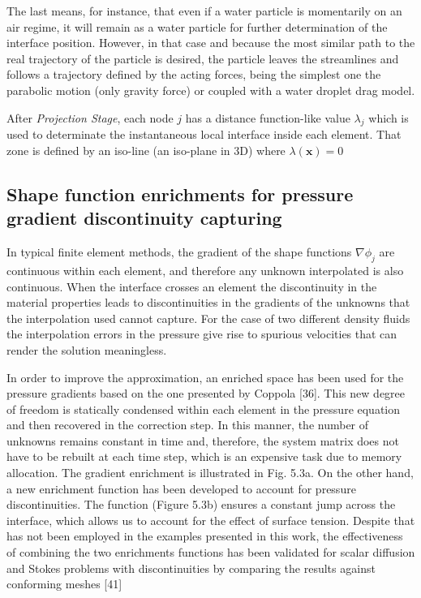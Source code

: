 \documentclass[a4paper,conference]{IEEEtran}
\newcommand{\xx}{\mathbf{x}}
\begin{document}
The last means, for instance, that even if a water particle is momentarily on an air regime, it will remain as a water particle for further determination of the interface position. However, in that case and because the most similar path to the real trajectory of the particle is desired, the particle leaves the streamlines and follows a trajectory defined by the acting forces, being the simplest one the parabolic motion (only gravity force) or coupled with a water droplet drag model.
 
After \textit{Projection Stage}, each node $j$ has a distance function-like value $\lambda_j$ which is used to determinate the instantaneous local interface inside each element. That zone is defined by an iso-line (an iso-plane in 3D) where $\lambda(\xx)=0$

\subsection{Shape function enrichments for pressure gradient discontinuity capturing}

In typical finite element methods, the gradient of the shape functions $\nabla\phi_j$ are continuous within each element, and therefore any unknown interpolated is also continuous. When the interface crosses an element the discontinuity in the material properties leads to discontinuities in the gradients of the unknowns that the interpolation used cannot capture. For the case of two different density fluids the interpolation errors in the pressure give rise to spurious velocities that can render the solution meaningless.

In order to improve the approximation, an enriched space has been used for the pressure gradients based on the one presented by Coppola [36]. This new degree of freedom is statically condensed within each element in the pressure equation and then recovered in the correction step. In this manner, the number of unknowns remains constant in time and, therefore, the system matrix does not have to be rebuilt at each time step, which is an expensive task due to memory allocation.  The gradient enrichment is illustrated in Fig. 5.3a.
On the other hand, a new enrichment function has been developed to account for pressure discontinuities. The function (Figure 5.3b) ensures a constant jump across the interface, which allows us to account for the effect of surface tension. Despite that has not been employed in the examples presented in this work, the effectiveness of combining the two enrichments functions has been validated for scalar diffusion and Stokes problems with discontinuities by comparing the results against conforming meshes [41]
\end{document}

